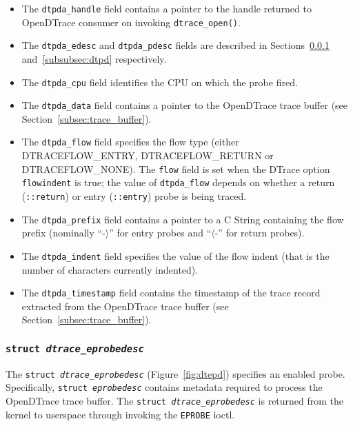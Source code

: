 \begin{itemize}

	\item The \texttt{dtpda\_handle} field contains a pointer to the handle
returned to OpenDTrace consumer on invoking \texttt{dtrace\_open()}.

	\item The \texttt{dtpda\_edesc} and \texttt{dtpda\_pdesc} fields are
described in Sections~\ref{subsubsec:dtepd} and~\ref{subsubsec:dtpd}
respectively.

	\item The \texttt{dtpda\_cpu} field identifies the CPU on which the
probe fired.

	\item The \texttt{dtpda\_data} field contains a pointer to the OpenDTrace
trace buffer (see Section~\ref{subsec:trace_buffer}).

	\item The \texttt{dtpda\_flow} field specifies the flow type (either
DTRACEFLOW\_ENTRY, DTRACEFLOW\_RETURN or DTRACEFLOW\_NONE). The \texttt{flow}
field is set when the DTrace option \texttt{flowindent} is true; the value of
\texttt{dtpda\_flow} depends on whether a return (\texttt{::return}) or entry
(\texttt{::entry}) probe is being traced.

	\item The \texttt{dtpda\_prefix} field contains a pointer to a C String
containing the flow prefix (nominally ``-$\rangle$'' for entry probes and
``$\langle$-'' for return probes).

	\item The \texttt{dtpda\_indent} field specifies the value of the flow
indent (that is the number of characters currently indented).

	\item The \texttt{dtpda\_timestamp} field contains the timestamp of the
trace record extracted from the OpenDTrace trace buffer (see
Section~\ref{subsec:trace_buffer}).

\end{itemize}

\subsubsection{\texttt{struct \textit{dtrace\_eprobedesc}}}
\label{subsubsec:dtepd}

The \texttt{struct~\textit{dtrace\_eprobedesc}} (Figure~\ref{fig:dtepd})
specifies an enabled probe. Specifically, \texttt{struct~\textit{eprobedesc}}
contains metadata required to process the OpenDTrace trace buffer. The
\texttt{struct~\textit{dtrace\_eprobedesc}} is returned from the kernel to
userspace through invoking the \texttt{EPROBE} ioctl.


